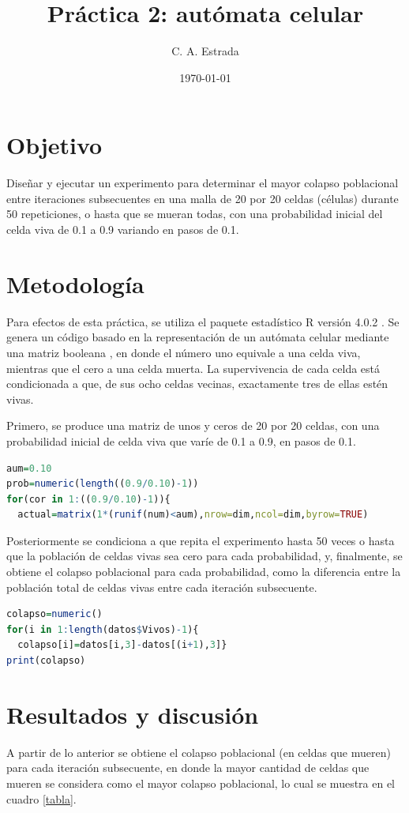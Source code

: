 \documentclass{article}
\title{\bf Práctica 2: autómata celular}
\date{\today}
\author{C. A. Estrada}
\begin{document}
\maketitle

\section{Objetivo}
Diseñar y ejecutar un experimento para determinar el mayor colapso poblacional entre iteraciones subsecuentes \cite{dra} en una malla de 20 por 20 celdas (células) durante 50 repeticiones, o hasta que se mueran todas, con una probabilidad inicial del celda viva de 0.1 a 0.9 variando en pasos de 0.1.

\section{Metodología}
Para efectos de esta práctica, se utiliza el paquete estadístico R versión 4.0.2 \cite{R}. Se genera un código basado en la representación de un autómata celular mediante una matriz booleana \cite{dra}, en donde el número uno equivale a una celda viva, mientras que el cero a una celda muerta. La supervivencia de cada celda está condicionada a que, de sus ocho celdas vecinas, exactamente tres de ellas estén vivas. 

Primero, se produce una matriz de unos y ceros de 20 por 20 celdas, con una probabilidad inicial de celda viva que varíe de 0.1 a 0.9, en pasos de 0.1. 
\begin{lstlisting}[language=R]
aum=0.10
prob=numeric(length((0.9/0.10)-1))
for(cor in 1:((0.9/0.10)-1)){
  actual=matrix(1*(runif(num)<aum),nrow=dim,ncol=dim,byrow=TRUE)
\end{lstlisting}

Posteriormente se condiciona a que repita el experimento hasta 50 veces o hasta que la población de celdas vivas sea cero para cada probabilidad, y, finalmente, se obtiene el colapso poblacional para cada probabilidad, como la diferencia entre la población total de celdas vivas entre cada iteración subsecuente.
\begin{lstlisting}[language=R]
colapso=numeric()
for(i in 1:length(datos$Vivos)-1){
  colapso[i]=datos[i,3]-datos[(i+1),3]}
print(colapso)
\end{lstlisting}

\section{Resultados y discusión}
A partir de lo anterior se obtiene el colapso poblacional (en celdas que mueren) para cada iteración subsecuente, en donde la mayor cantidad de celdas que mueren se considera como el mayor colapso poblacional, lo cual se muestra en el cuadro \ref{tabla}. 
\end{document}
